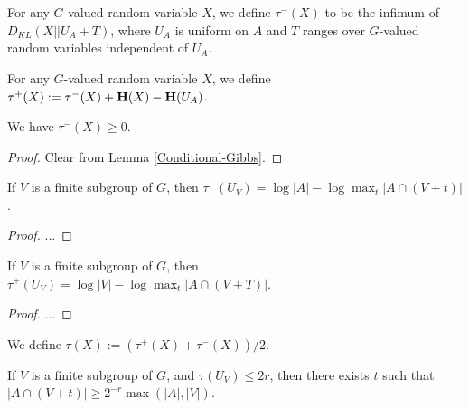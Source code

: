 \begin{definition}\label{tauminus-def}  For any $G$-valued random variable $X$, we define $\tau^-(X)$ to be the infimum of $D_{KL}(X || U_A + T)$, where $U_A$ is uniform on $A$ and $T$ ranges over $G$-valued random variables independent of $U_A$.
\end{definition}

\begin{definition}\label{tauplus-def}  For any $G$-valued random variable $X$, we define $\tau^+(X) := \tau^-(X) + {\bf H}(X) - {\bf H}(U_A)$.
\end{definition}

\begin{lemma}\label{tauminus-nonneg}  We have $\tau^-(X) \geq 0$.
\end{lemma}

\begin{proof} Clear from Lemma \ref{Conditional-Gibbs}.
\end{proof}



\begin{lemma}\label{tauminus-subspace} If $V$ is a finite subgroup of $G$, then $\tau^-(U_V) = \log |A| - \log \max_t |A \cap (V+t)|$.
\end{lemma}

\begin{proof} ...
\end{proof}

\begin{corollary}\label{tauplus-subspace} If $V$ is a finite subgroup of $G$, then $\tau^+(U_V) = \log |V| - \log \max_t |A \cap (V+T)|$.
\end{corollary}

\begin{proof} ...
\end{proof}

\begin{definition}  We define $\tau(X) := (\tau^+(X) + \tau^-(X))/2$.
\end{definition}

\begin{lemma}\label{tau-subspace}  If $V$ is a finite subgroup of $G$, and $\tau(U_V) \leq 2r$, then there exists $t$ such that $|A \cap (V+t)| \geq 2^{-r} \max(|A|, |V|)$.
\end{lemma}

